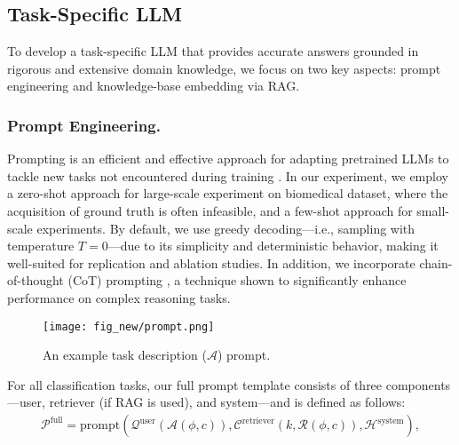 \subsection{Task-Specific LLM}\label{subsec:task_specific}
To develop a task-specific LLM that provides accurate answers grounded in rigorous and extensive domain knowledge, we focus on two key aspects: prompt engineering and knowledge-base embedding via RAG. %

\subsubsection{Prompt Engineering.}\label{subsec:prompt} %

Prompting is an efficient and effective approach for adapting pretrained LLMs to tackle new tasks not encountered during training \citep{radford2019language, liu2023prompting}. In our experiment, we employ a zero-shot approach for large-scale experiment on biomedical dataset, where the acquisition of ground truth is often infeasible, and a few-shot approach for small-scale experiments. By default, we use greedy decoding—i.e., sampling with temperature \( T=0 \)—due to its simplicity and deterministic behavior, making it well-suited for replication and ablation studies. In addition, we incorporate chain-of-thought (CoT) prompting \citep{wei2022chain}, a technique shown to significantly enhance performance on complex reasoning tasks.

\begin{figure}[h]
    \centering    \texttt{[image: fig\_new/prompt.png]}
    \scriptsize
    \caption{An example task description ($\mathcal{A}$) prompt.}
    \label{fig:prompt}
\end{figure}

For all classification tasks, our full prompt template consists of three components—user, retriever (if RAG is used), and system—and is defined as follows:
\begin{align*}
\mathcal{P}^{\text{full}} = \text{prompt}(\mathcal{Q}^{\text{user}}(\mathcal{A}(\phi,c)), \mathcal{C}^{\text{retriever}}(k,\mathcal{R}(\phi,c)), \mathcal{H}^{\text{system}}), 
\end{align*}

